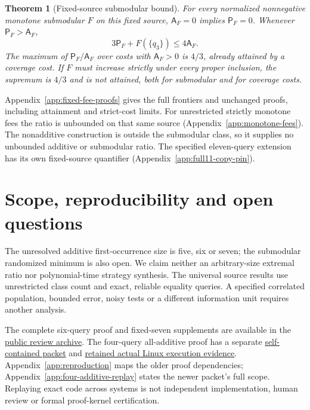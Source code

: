 \documentclass[pdflatex,sn-mathphys-num]{sn-jnl}
\newcommand{\A}{\mathsf{A}}
\newcommand{\Pcost}{\mathsf{P}}
\theoremstyle{thmstyleone}
\newtheorem{theorem}{Theorem}
\theoremstyle{thmstylethree}
\theoremstyle{thmstyletwo}
\begin{document}
\begin{theorem}[Fixed-source submodular bound]\label{thm:submodular}
For every normalized nonnegative monotone submodular $F$ on this fixed source, $\A_F=0$ implies $\Pcost_F=0$. Whenever $\Pcost_F>\A_F$,
\begin{equation}\label{eq:strengthened}
 3\Pcost_F+F(\{q_3\})\leq4\A_F.
\end{equation}
The maximum of $\Pcost_F/\A_F$ over costs with $\A_F>0$ is $4/3$, already attained by a coverage cost. If $F$ must increase strictly under every proper inclusion, the supremum is $4/3$ and is not attained, both for submodular and for coverage costs.
\end{theorem}

Appendix~\ref{app:fixed-fee-proofs} gives the full frontiers and
unchanged proofs, including attainment and strict-cost limits.
For unrestricted strictly monotone fees the ratio is unbounded on
that same source (Appendix~\ref{app:monotone-fees}). The nonadditive
construction is outside the submodular class, so it supplies no
unbounded additive or submodular ratio. The specified eleven-query
extension has its own fixed-source quantifier
(Appendix~\ref{app:full11-copy-pin}).

\section{Scope, reproducibility and open questions}
\label{sec:scope-core}
The unresolved additive first-occurrence size is five, six or seven;
the submodular randomized minimum is also open. We claim neither an
arbitrary-size extremal ratio nor polynomial-time strategy synthesis.
The universal source results use unrestricted class count and exact,
reliable equality queries. A specified correlated population, bounded
error, noisy tests or a different information unit requires another analysis.

The complete six-query proof and fixed-seven supplements are available
in the \href{https://github.com/SHiJiE1115/newproj/releases/tag/complete-six-review-20261011-v01}{public review archive}.
The four-query all-additive proof has a separate
\href{https://github.com/SHiJiE1115/newproj/tree/837498553f02739d60d3c53f79b8141ac4f5e105/theory/four_query_additive_v01}{self-contained packet}
and \href{https://github.com/SHiJiE1115/newproj/tree/468d5a4df39611102c8b08aaecd8a05d6a6582b1/evidence/four_additive_hosted_v01}{retained actual Linux execution evidence}.
Appendix~\ref{app:reproduction} maps the older proof dependencies;
Appendix~\ref{app:four-additive-replay} states the newer packet's full
scope. Replaying exact code across systems is not independent
implementation, human review or formal proof-kernel certification.
\end{document}
